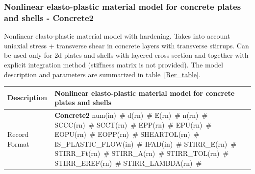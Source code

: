\documentclass[a4paper]{article}
\newcommand{\descitem}[1]{{\noindent \bf #1}}
\newcommand{\elemparam}[2]{{{#1\tiny (#2)}~\#}}
\begin{document}
\subsubsection{Nonlinear elasto-plastic material model for concrete
plates and shells - Concrete2}
\label{Rer}
Nonlinear elasto-plastic material model with hardening.
Takes into account uniaxial stress + transverse shear in concrete
layers with transverse stirrups.
Can be used only for 2d plates and shells with layered cross section
and together with explicit integration method (stiffness matrix is not
provided).
The model description and parameters are summarized
in table~\ref{Rer_table}.

\begin{table}[!htb]
\begin{tabular}{|l|p{9cm}|}
\hline
Description & Nonlinear elasto-plastic material model for concrete
plates and shells\\
\hline
Record Format & \descitem{Concrete2} \elemparam{num}{in}
\elemparam{d}{rn} \elemparam{E}{rn} \elemparam{n}{rn}
\elemparam{SCCC}{rn} \elemparam{SCCT}{rn} \elemparam{EPP}{rn} \elemparam{EPU}{rn}
\elemparam{EOPU}{rn} \elemparam{EOPP}{rn} \elemparam{SHEARTOL}{rn}
\elemparam{IS\_PLASTIC\_FLOW}{in} \elemparam{IFAD}{in} \elemparam{STIRR\_E}{rn} \elemparam{STIRR\_Ft}{rn}
\elemparam{STIRR\_A}{rn} \elemparam{STIRR\_TOL}{rn} \elemparam{STIRR\_EREF}{rn}
\elemparam{STIRR\_LAMBDA}{rn}\\


\end{tabular}
\end{table}
\end{document}

